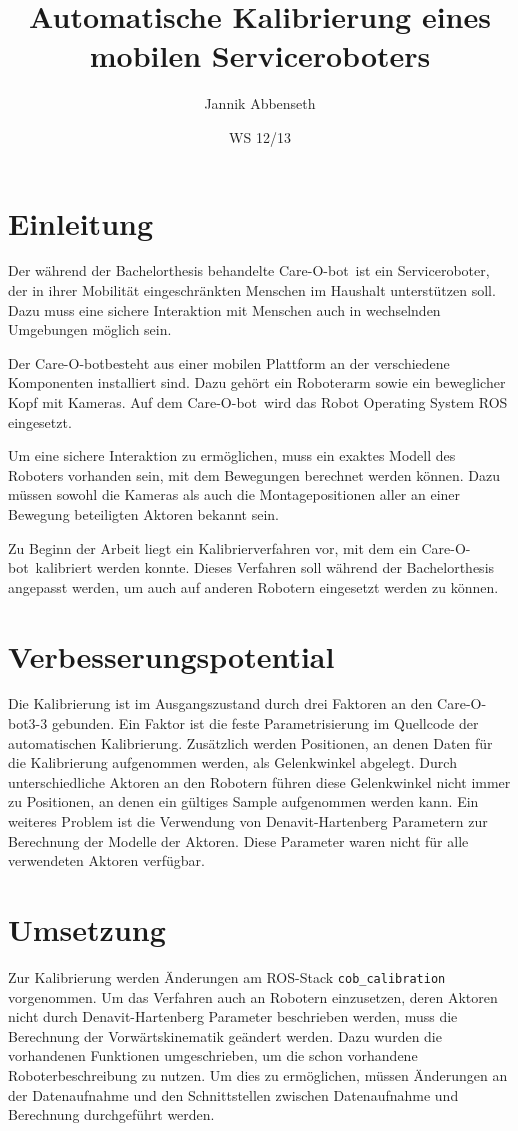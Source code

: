 \documentclass{scrartcl}
\title{Automatische Kalibrierung eines mobilen Serviceroboters}
\author{Jannik Abbenseth}
\date{WS 12/13}
\newcommand{\cob}{Care-O-bot}
\begin{document}
 
\maketitle
\section{Einleitung}

Der während der Bachelorthesis behandelte \cob\ ist ein Serviceroboter, der
in ihrer Mobilität eingeschränkten Menschen im Haushalt unterstützen soll. 
Dazu muss eine sichere Interaktion mit Menschen auch in wechselnden Umgebungen
möglich sein.

Der \cob besteht aus einer mobilen Plattform an der verschiedene Komponenten 
installiert sind. Dazu gehört ein Roboterarm sowie ein beweglicher Kopf mit 
Kameras. Auf dem \cob\ wird das Robot Operating System ROS eingesetzt. 

Um eine sichere Interaktion zu ermöglichen, muss ein exaktes Modell des 
Roboters vorhanden sein, mit dem Bewegungen berechnet werden können.
Dazu müssen sowohl die Kameras als auch die Montagepositionen aller an einer
Bewegung beteiligten Aktoren bekannt sein.

Zu Beginn der Arbeit liegt ein Kalibrierverfahren vor, mit dem ein \cob\ 
kalibriert werden konnte. Dieses Verfahren soll während der Bachelorthesis
angepasst werden, um auch auf anderen Robotern eingesetzt werden zu können.


\section{Verbesserungspotential}
\label{sec:Verbesserungspotential}

Die Kalibrierung ist im Ausgangszustand durch drei Faktoren an den \cob3-3 
gebunden. Ein Faktor ist die feste Parametrisierung im Quellcode der
automatischen Kalibrierung. Zusätzlich werden Positionen, an denen Daten für 
die Kalibrierung aufgenommen werden, als Gelenkwinkel abgelegt. Durch 
unterschiedliche Aktoren an den Robotern führen diese Gelenkwinkel nicht immer
zu Positionen, an denen ein gültiges Sample aufgenommen werden kann. Ein weiteres
Problem ist die Verwendung von Denavit-Hartenberg Parametern zur Berechnung der
Modelle der Aktoren. Diese Parameter waren nicht für alle verwendeten Aktoren
verfügbar.

\section{Umsetzung}
Zur Kalibrierung werden Änderungen am ROS-Stack \texttt{cob\_calibration}
vorgenommen. Um das Verfahren auch an Robotern einzusetzen, deren Aktoren nicht 
durch Denavit-Hartenberg Parameter beschrieben werden, muss die Berechnung der
Vorwärtskinematik geändert werden. Dazu wurden die vorhandenen Funktionen 
umgeschrieben, um die schon vorhandene Roboterbeschreibung zu nutzen. Um dies
zu ermöglichen, müssen Änderungen an der Datenaufnahme und den Schnittstellen
zwischen Datenaufnahme und Berechnung durchgeführt werden.
\end{document}
